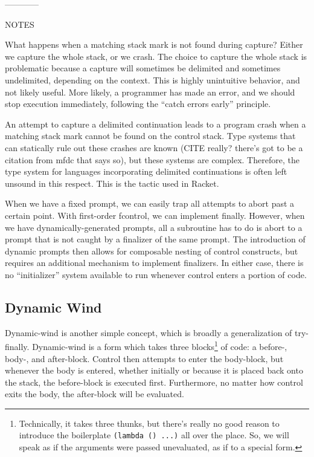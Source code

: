 \documentclass[11pt]{article}
\newcommand{\maybePage}{\newpage}
\begin{document}
------------

NOTES

What happens when a matching stack mark is not found during capture?
Either we capture the whole stack, or we crash.
The choice to capture the whole stack is problematic because a capture will sometimes be delimited and sometimes undelimited, depending on the context.
This is highly unintuitive behavior, and not likely useful.
More likely, a programmer has made an error, and we should stop execution immediately, following the ``catch errors early'' principle.

An attempt to capture a delimited continuation leads to a program crash when a matching stack mark cannot be found on the control stack.
Type systems that can statically rule out these crashes are known (CITE really? there's got to be a citation from mfdc that says so), but these systems are complex.
Therefore, the type system for languages incorporating delimited continuations is often left unsound in this respect.
This is the tactic used in Racket.

When we have a fixed prompt, we can easily trap all attempts to abort past a certain point.
With first-order fcontrol, we can implement finally.
However, when we have dynamically-generated prompts, all a subroutine has to do is abort to a prompt that is not caught by a finalizer of the same prompt.
The introduction of dynamic prompts then allows for composable nesting of control constructs, but requires an additional mechanism to implement finalizers.
In either case, there is no ``initializer'' system available to run whenever control enters a portion of code.



\maybePage
\subsection{Dynamic Wind}
\label{dynamic-wind}

Dynamic-wind is another simple concept, which is broadly a generalization of try-finally.
Dynamic-wind is a form which takes three blocks\footnote{Technically, it takes three thunks, but there's really no good reason to introduce the boilerplate \texttt{(lambda () ...)} all over the place. So, we will speak as if the arguments were passed unevaluated, as if to a special form.} of code: a before-, body-, and after-block.
Control then attempts to enter the body-block, but whenever the body is entered, whether initially or because it is placed back onto the stack, the before-block is executed first.
Furthermore, no matter how control exits the body, the after-block will be evaluated.
\end{document}

